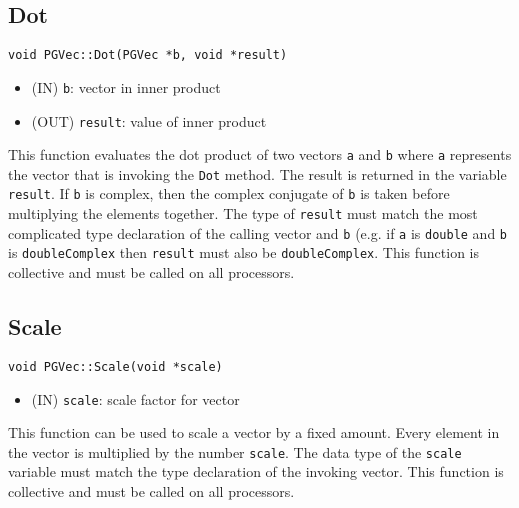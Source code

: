 \documentclass[12pt]{article}
\begin{document}
\subsection{Dot}
\begin{verbatim}
void PGVec::Dot(PGVec *b, void *result)
\end{verbatim}
\begin{itemize}
\item (IN) \texttt{b}: vector in inner product
\item (OUT) \texttt{result}: value of inner product
\end{itemize}
This function evaluates the dot product of two vectors \texttt{a} and
\texttt{b} where \texttt{a} represents the vector that is invoking the
\texttt{Dot} method. The result is returned in the variable \texttt{result}. If
\texttt{b} is complex, then the complex conjugate of \texttt{b} is taken before
multiplying the elements together. The type of \texttt{result} must match the most
complicated type declaration of the calling vector and \texttt{b} (e.g. if
\texttt{a} is \texttt{double} and \texttt{b} is \texttt{doubleComplex} then
\texttt{result} must also be \texttt{doubleComplex}. This function
is collective and must be called on all processors.
\subsection{Scale}
\begin{verbatim}
void PGVec::Scale(void *scale)
\end{verbatim}
\begin{itemize}
\item (IN) \texttt{scale}: scale factor for vector
\end{itemize}
This function can be used to scale a vector by a fixed amount. Every element in
the vector is multiplied by the number \texttt{scale}. The data type of the
\texttt{scale} variable must match the type declaration of the invoking vector.
This function is collective and must be called on all processors.
\end{document}
